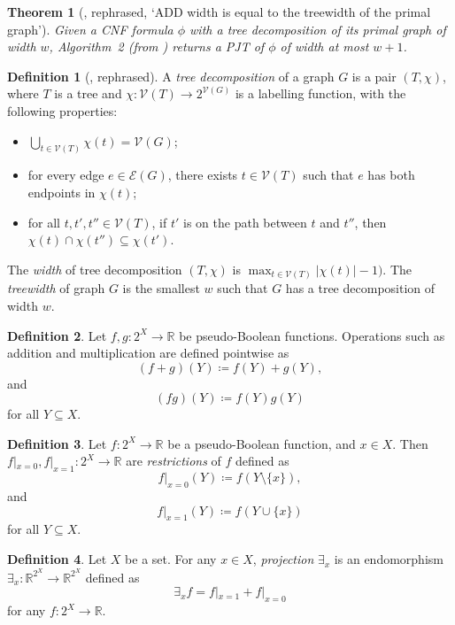 \documentclass{article}
\newtheorem{theorem}{Theorem}
\theoremstyle{definition}
\newtheorem{definition}{Definition}
\theoremstyle{remark}
\begin{document}
\begin{theorem}[\cite{DBLP:conf/cp/DudekPV20}, rephrased, `ADD width is equal
  to the treewidth of the primal graph']
  Given a CNF formula $\phi$ with a tree decomposition of its primal graph of
  width $w$, Algorithm~2 (from \cite{DBLP:conf/cp/DudekPV20}) returns a
  PJT of $\phi$ of width at most $w+1$.
\end{theorem}

\begin{definition}[\cite{DBLP:journals/jct/RobertsonS84}, rephrased]
  A \emph{tree decomposition} of a graph $G$ is a pair $(T, \chi)$, where $T$ is
  a tree and $\chi\colon \mathcal{V}(T) \to 2^{\mathcal{V}(G)}$ is a labelling
  function, with the following properties:
  \begin{itemize}
  \item $\bigcup_{t \in \mathcal{V}(T)} \chi(t) = \mathcal{V}(G)$;
  \item for every edge $e \in \mathcal{E}(G)$, there exists $t \in
    \mathcal{V}(T)$ such that $e$ has both endpoints in $\chi(t)$;
  \item for all $t, t', t'' \in \mathcal{V}(T)$, if $t'$ is on the path between
    $t$ and $t''$, then $\chi(t) \cap \chi(t'') \subseteq \chi(t')$.
  \end{itemize}
  The \emph{width} of tree decomposition $(T, \chi)$ is $\max_{t \in
    \mathcal{V}(T)} |\chi(t)| - 1)$. The \emph{treewidth} of graph $G$ is the
  smallest $w$ such that $G$ has a tree decomposition of width $w$.
\end{definition}

\begin{definition} \label{def:operations}
  Let $f, g\colon 2^X \to \mathbb{R}$ be pseudo-Boolean functions. Operations
  such as addition and multiplication are defined pointwise as
  \[
    (f+g)(Y) \coloneqq f(Y)+g(Y),
  \]
  and
  \[
    (fg)(Y) \coloneqq f(Y)g(Y)
  \]
  for all $Y \subseteq X$.
\end{definition}

\begin{definition} \label{def:restriction}
  Let $f\colon 2^X \to \mathbb{R}$ be a pseudo-Boolean function, and $x \in X$.
  Then $f|_{x=0}, f|_{x=1}\colon 2^X \to \mathbb{R}$ are \emph{restrictions} of
  $f$ defined as
  \[
    f|_{x=0}(Y) \coloneqq f(Y \setminus \{x\}),
  \]
  and
  \[
    f|_{x=1}(Y) \coloneqq f(Y \cup \{x\})
  \]
  for all $Y \subseteq X$.
\end{definition}

\begin{definition} \label{def:projection}
  Let $X$ be a set. For any $x \in X$, \emph{projection} $\exists_x$ is an
  endomorphism $\exists_x\colon \mathbb{R}^{2^X} \to \mathbb{R}^{2^X}$ defined
  as
  \[
    \exists_xf = f|_{x=1} + f|_{x=0}
  \]
  for any $f\colon 2^X \to \mathbb{R}$.
\end{definition}
\end{document}
